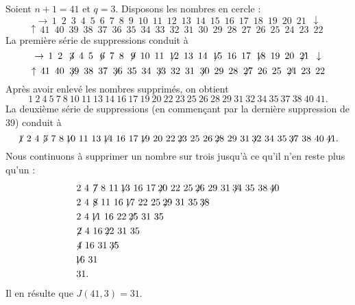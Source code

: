 \begin{example}
Soient $n+1=41$ et $q=3$. Disposons les nombres en cercle :
\[
\rightarrow\,1\enspace 2\enspace 3\enspace 4\enspace 5\enspace 6\enspace 7\enspace 8\enspace 9\enspace 10\enspace 
           11\enspace 12\enspace 13\enspace 14\enspace 15\enspace 16\enspace 17\enspace 18\enspace 19\enspace 20\enspace 21\enspace 
\downarrow\]
\[\uparrow\,41\enspace 40\enspace 39\enspace 38\enspace 37\enspace 36\enspace 35\enspace 34\enspace 33\enspace 
32\enspace 31\enspace 30\enspace 29\enspace 28\enspace 27\enspace 26\enspace 25\enspace 24\enspace 23\enspace 22\enspace 
\]
La première série de suppressions conduit à 
\[
\rightarrow\, 1\enspace  2\enspace \!\not\! 3\enspace 4\enspace 5\enspace \!\not\! 6\enspace 7\enspace 8\enspace \!\not\! 9\enspace 10\enspace       11\enspace \!\not\!\! 12\enspace 13\enspace 14\enspace \!\not\!\! 15\enspace 16\enspace 17\enspace \!\not\!\! 18\enspace 19\enspace 20\enspace \!\not\!\! 21\enspace 
\downarrow\]
\[\uparrow\, 41\enspace40 \enspace\!\not\!\! 39\enspace 38\enspace 37\enspace \!\not\!\! 36\enspace 35\enspace 34\enspace\!\not\!\! 33\enspace 32\enspace 31\enspace \!\not\!\! 30\enspace 29\enspace 28\enspace\!\not\!\! 27\enspace 26\enspace 25\enspace\!\not\!\! 24\enspace 23\enspace 22
\]
Après avoir enlevé les nombres  supprimés, on obtient
\[
1\ 2\ 4\ 5\ 7\ 8\ 10\ 11\ 13\ 14\ 16\ 17\ 19\ 20\ 
22\ 23\ 25\ 26\ 28\ 29\ 31\ 32\ 34\ 35\ 37\ 38\ 40\ 41.
\]
La deuxième série de suppressions (en commençant par la dernière suppression de 39) conduit à 
\[
\not\! 1\ 2\ 4 \not\!5\ 7\ 8 \not\!\! 10\ 11\ 13 \not\!\!14\ 16 \ 17 \not\!\! 19\ 20\ 
22 \not\!\! 23\ 25\ 26 \not\!\! 28\ 29\ 31 \not\!\! 32\ 34\ 
 35 \not\!\! 37\ 38\ 40 \not\!\! 41.
\]
Nous continuons à supprimer un nombre sur trois jusqu'à ce qu'il n'en reste plus qu'un :
\begin{align*}
&2\  4 \not\!7\ 8\ 11 \not\!\!13\ 16\ 17 \not\!\!20\ 22\ 25 \not\!\!26\ 29\ 31 \not\!\!34\ 35\ 38 \not\!\!40
\\
&2\ 4 \not\!8\ 11\ 16 \not\!\!17\ 22\ 25 \not\!\!29\ 31\ 35 \not\!\!38\\
&2\ 4 \not\!\!11\ 16\ 22 \not\!\!25\ 31\ 35\\
&\!\!\not\!2\ 4\ 16 \not\!\!22\ 31\ 35\\
&\!\!\not\!4\ 16\ 31 \not\!\!35\\
&\!\!\not\!\!16\ 31\\
&31.
\end{align*}
Il en résulte que $J(41,3)=31$.
\end{example}

